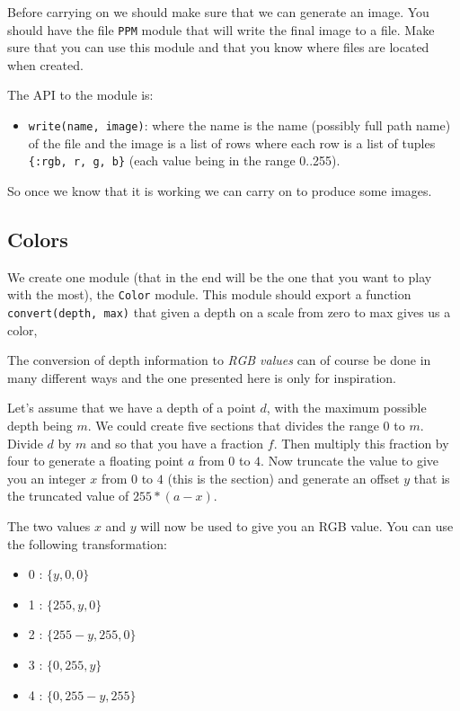 \documentclass[a4paper,11pt]{article}
\begin{document}
Before carrying on we should make sure that we can generate an
image. You should have the file {\tt PPM} module that will write the
final image to a file. Make sure that you can use this module and that
you know where files are located when created.

The API to the module is:

\begin{itemize}
 \item {\tt write(name, image)}: where the name is the name (possibly
   full path name) of the file and the image is a list of rows where
   each row is a list of tuples {\tt \{:rgb, r, g, b\}} (each value being in
   the range 0..255).
\end{itemize}

So once we know that it is working we can carry on to produce some images.


\subsection{Colors}
We create one module (that in the end will be the one that you want to
play with the most), the {\tt Color} module. This module should export
a function {\tt convert(depth, max)} that given a depth on a scale
from zero to max gives us a color,

The conversion of depth information to {\em RGB values} can of course
be done in many different ways and the one presented here is only for
inspiration.

Let's assume that we have a depth of a point $d$, with the maximum
possible depth being $m$. We could create five sections that divides
the range $0$ to $m$. Divide $d$ by $m$ and so that you have a
fraction $f$. Then multiply this fraction by four to generate a
floating point $a$ from $0$ to $4$. Now truncate the value to give you
an integer $x$ from $0$ to $4$ (this is the section) and generate an
offset $y$ that is the truncated value of $255 * (a - x)$.

The two values $x$ and $y$ will now be used to give you an RGB
value. You can use the following transformation:

\begin {itemize}
\item 0 : $\lbrace y, 0, 0 \rbrace$
\item 1 : $\lbrace 255, y, 0 \rbrace$
\item 2 : $\lbrace 255-y, 255, 0 \rbrace$
\item 3 : $\lbrace 0, 255, y \rbrace$
\item 4 : $\lbrace 0, 255-y, 255 \rbrace$
\end{itemize}
\end{document}
